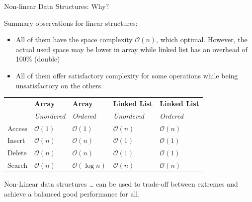 \documentclass[aspectratio=169, xcolor=dvipsnames]{beamer}
\begin{document}
\begin{frame}{Non-linear Data Structures: Why?}
    \begin{block}{Summary observations for linear structures:}
        \begin{itemize}[<+->]
            \item All of them have the space complexity $\mathcal{O}(n)$, which optimal. However, the actual used space may be lower in array while linked list has an overhead of 100\% (double)
            \item All of them offer satisfactory complexity for some operations while being unsatisfactory on the others.
        \end{itemize}
    \end{block}
    \begin{table}[]
        \centering
        \begin{tabular}{lllll}
        \toprule
                & \textbf{Array} & \textbf{Array} & \textbf{Linked List} & \textbf{Linked List} \\
                & \textit{Unordered} & \textit{Ordered} & \textit{Unordered}   & \textit{Ordered}     \\ \midrule
        Access  & $\mathcal{O}(1)$ & $\mathcal{O}(1)$ & $\mathcal{O}(n)$       & $\mathcal{O}(n)$       \\
        Insert  & $\mathcal{O}(n)$ & $\mathcal{O}(n)$ & $\mathcal{O}(1)$       & $\mathcal{O}(1)$       \\
        Delete  & $\mathcal{O}(n)$ & $\mathcal{O}(n)$ & $\mathcal{O}(1)$       & $\mathcal{O}(1)$       \\
        Search  & $\mathcal{O}(n)$ & $\mathcal{O}(\log n)$ & $\mathcal{O}(n)$       & $\mathcal{O}(n)$       \\ \bottomrule
        \end{tabular}
    \end{table}
    \begin{alertblock}{Non-Linear data structures \dots}
        can be used to trade-off between extremes and achieve a balanced good performance for all.
    \end{alertblock}
\end{frame}
\end{document}
